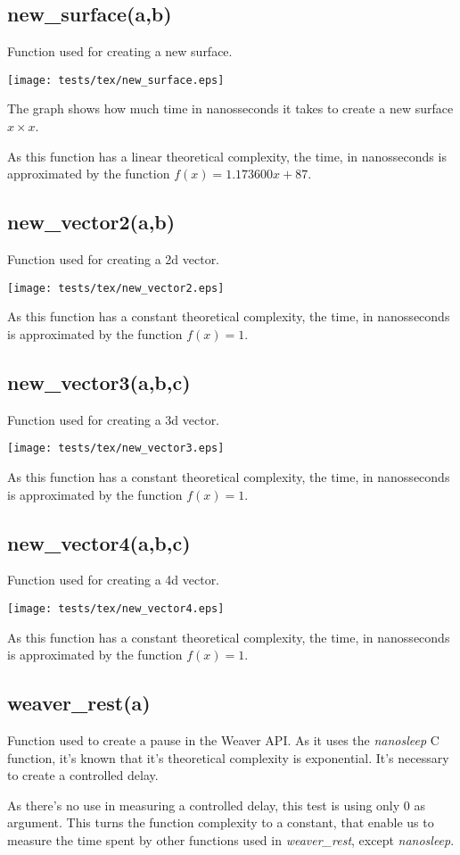 \documentclass{article}
\begin{document}
\subsection{new\_surface(a,b)}
Function used for creating a new surface.

\texttt{[image: tests/tex/new\_surface.eps]}

The graph shows how much time in nanosseconds it takes to create a new surface $x \times x $.

As this function has a linear theoretical
complexity, the time, in nanosseconds is 
approximated by the function $f(x)=1.173600x+87$.
\subsection{new\_vector2(a,b)}
Function used for creating a 2d vector.


\texttt{[image: tests/tex/new\_vector2.eps]}

As this function has a constant theoretical
complexity, the time, in nanosseconds is 
approximated by the function $f(x)=1$.
\subsection{new\_vector3(a,b,c)}
Function used for creating a 3d vector.


\texttt{[image: tests/tex/new\_vector3.eps]}

As this function has a constant theoretical
complexity, the time, in nanosseconds is 
approximated by the function $f(x)=1$.
\subsection{new\_vector4(a,b,c)}
Function used for creating a 4d vector.


\texttt{[image: tests/tex/new\_vector4.eps]}

As this function has a constant theoretical
complexity, the time, in nanosseconds is 
approximated by the function $f(x)=1$.
\subsection{weaver\_rest(a)}
Function used to create a pause in the Weaver API.
As it uses the \emph{nanosleep} C function, it's
known that it's theoretical complexity is
exponential. It's necessary to create a controlled
delay.

As there's no use in measuring a controlled delay,
this test is using only $0$ as argument. This
turns the function complexity to a constant, that
enable us to measure the time spent by other
functions used in \emph{weaver\_rest}, except
\emph{nanosleep}.
\end{document}
